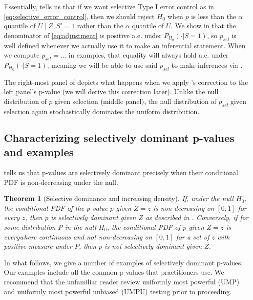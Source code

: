 \documentclass{article}
\newtheorem{theorem}{Theorem}
\begin{document}
Essentially,  tells us that if we want selective Type I error control as in \eqref{eq:selective_error_control}, then we should reject $H_0$ when $p$ is less than the $\alpha$ quantile of $U \mid Z, S' = 1$ rather than the $\alpha$ quantile of $U$. We show in  that the denominator of \eqref{eq:adjustment} is positive a.e. under $P_{H_0}(\cdot | S=1)$, so $p_{sel}$ is well defined whenever we actually use it to make an inferential statement. When we compute $p_{sel} = \dots$ in examples, that equality will always hold a.e. under $P_{H_0}(\cdot | S=1)$, meaning we will be able to use said $p_{sel}$ to make inferences via . 

The right-most panel of  depicts what happens when we apply 's correction to the left panel's p-value (we will derive this correction later). Unlike the null distribution of $p$ given selection (middle panel), the null distribution of $p_{sel}$ given selection again stochastically dominates the uniform distribution. 

\subsection{Characterizing selectively dominant p-values and examples}

 tells us that p-values are selectively dominant precisely when their conditional PDF is non-decreasing under the null. 

\begin{theorem}[Selective dominance and increasing density]
    \label{thm:density}
    If, under the null $H_0$, the conditional PDF of the p-value $p$ given $Z=z$ is non-decreasing on $[0, 1]$ for every $z$, then $p$ is selectively dominant given $Z$ as described in . Conversely, if for some distribution $P$ in the null $H_0$, the conditional PDF of $p$ given $Z=z$ is everywhere continuous and not non-decreasing on $[0, 1]$ for a set of $z$ with positive measure under $P$, then $p$ is not selectively dominant given $Z$.  
\end{theorem}

In what follows, we give a number of examples of selectively dominant p-values. Our examples include all the common p-values that practitioners use. We recommend that the unfamiliar reader review uniformly most powerful (UMP) and uniformly most powerful unbiased (UMPU) testing \cite[Chapter 3 and Chapter 4]{Lehmann} prior to proceeding.
\end{document}
